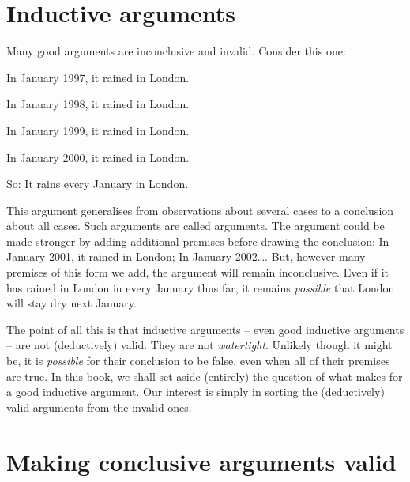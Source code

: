 \section{Inductive arguments}
Many good arguments are inconclusive and invalid. Consider this one:
	\begin{earg}
		\item[] In January 1997, it rained in London.
		\item[] In January 1998, it rained in London.
		\item[] In January 1999, it rained in London.
		\item[] In January 2000, it rained in London.
	\item[So:] It rains every January in London.
\end{earg}
This argument generalises from observations about several cases to a conclusion about all cases. Such arguments are called  arguments. The argument could be made stronger by adding additional premises before drawing the conclusion: In January 2001, it rained in London; In January 2002\ldots. But, however many premises of this form we add, the argument will remain inconclusive. Even if it has rained in London in every January thus far, it remains \emph{possible} that London will stay dry next January.

The point of all this is that inductive arguments – even good inductive arguments – are not (deductively) valid. They are not \emph{watertight}. Unlikely though it might be, it is \emph{possible} for their conclusion to be false, even when all of their premises are true. In this book, we shall set aside (entirely) the question of what makes for a good inductive argument. Our interest is simply in sorting the (deductively) valid arguments from the invalid ones.



\section{Making conclusive arguments valid} %


